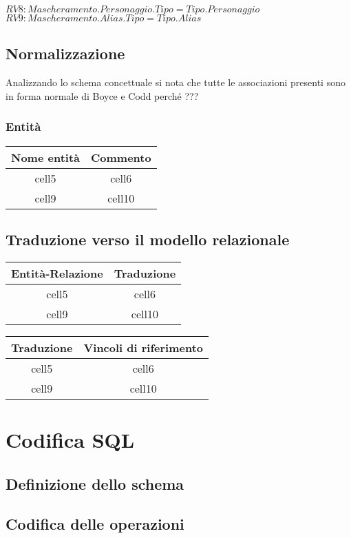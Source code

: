\documentclass{article}
\newcommand{\sqlinputlisting}[2]{
	
}
\newcommand{\sql}[1]{
	\sqlinputlisting{../src/#1.sql}
	{\texttt{#1.sql}}
}
\begin{document}
$RV8: Mascheramento.Personaggio.Tipo = Tipo.Personaggio $
$RV9: Mascheramento.Alias.Tipo = Tipo.Alias $

\subsection{Normalizzazione}
Analizzando lo schema concettuale si nota che tutte le associazioni presenti
sono in forma normale di Boyce e Codd perché ???

\subsubsection{Entità}

\begin{center}\begin{tabular}{ |c|c| }
		\hline
		\textbf{Nome entità} & \textbf{Commento} \\
		\hline
		cell5                & cell6             \\
		\hline
		cell9                & cell10            \\
		\hline
	\end{tabular}\end{center}

\subsection{Traduzione verso il modello relazionale}

\begin{center}\begin{tabular}{ |c|c| }
		\hline
		\textbf{Entità-Relazione} & \textbf{Traduzione} \\
		\hline
		cell5                     & cell6               \\
		\hline
		cell9                     & cell10              \\
		\hline
	\end{tabular}\end{center}

\begin{center}\begin{tabular}{ |c|c| }
		\hline
		\textbf{Traduzione} & \textbf{Vincoli di riferimento} \\
		\hline
		cell5               & cell6                           \\
		\hline
		cell9               & cell10                          \\
		\hline
	\end{tabular}\end{center}

\section{Codifica SQL}

\subsection{Definizione dello schema}

\sql{schema}

\subsection{Codifica delle operazioni}

\sql{operation-01}
\end{document}
